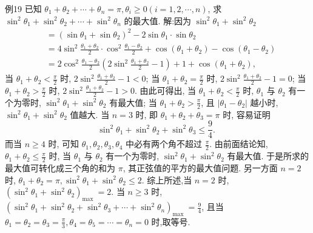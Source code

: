 例19 已知 $\theta_1+\theta_2+\cdots+\theta_n=\pi, \theta_i \geqslant 0 (i=1,2, \cdots, n)$, 求 $\sin ^2 \theta_1+\sin ^2 \theta_2+\cdots+\sin ^2 \theta_n$ 的最大值.
解:因为 $\sin ^2 \theta_1+\sin ^2 \theta_2$
$$
\begin{aligned}
& =\left(\sin \theta_1+\sin \theta_2\right)^2-2 \sin \theta_1 \cdot \sin \theta_2 \\
& =4 \sin ^2 \frac{\theta_1+\theta_2}{2} \cdot \cos ^2 \frac{\theta_1-\theta_2}{2}+\cos \left(\theta_1+\theta_2\right)-\cos \left(\theta_1-\theta_2\right) \\
& =2 \cos ^2 \frac{\theta_1-\theta_2}{2}\left(2 \sin ^2 \frac{\theta_1+\theta_2}{2}-1\right)+1+\cos \left(\theta_1+\theta_2\right),
\end{aligned}
$$
当 $\theta_1+\theta_2<\frac{\pi}{2}$ 时, $2 \sin ^2 \frac{\theta_1+\theta_2}{2}-1<0$;
当 $\theta_1+\theta_2=\frac{\pi}{2}$ 时, $2 \sin ^2 \frac{\theta_1+\theta_2}{2}-1=0$;
当 $\theta_1+\theta_2>\frac{\pi}{2}$ 时, $2 \sin ^2 \frac{\theta_1+\theta_2}{2}-1>0$.
由此可得出, 当 $\theta_1+\theta_2<\frac{\pi}{2}$ 时, $\theta_1$ 与 $\theta_2$ 有一个为零时, $\sin ^2 \theta_1+\sin ^2 \theta_2$ 有最大值; 当 $\theta_1+\theta_2>\frac{\pi}{2}$, 且 $\left|\theta_1-\theta_2\right|$ 越小时, $\sin ^2 \theta_1+\sin ^2 \theta_2$ 值越大.
当 $n=3$ 时, 即 $\theta_1+\theta_2+\theta_3=\pi$ 时, 容易证明
$$
\sin ^2 \theta_1+\sin ^2 \theta_2+\sin ^2 \theta_3 \leqslant \frac{9}{4} \text {. }
$$
而当 $n \geqslant 4$ 时, 可知 $\theta_1, \theta_2, \theta_3, \theta_4$ 中必有两个角不超过 $\frac{\pi}{2}$.
由前面结论知, $\theta_1+\theta_2 \leqslant \frac{\pi}{2}$ 时, 当 $\theta_1$ 与 $\theta_2$ 有一个为零时, $\sin ^2 \theta_1+\sin ^2 \theta_2$ 有最大值.
于是所求的最大值可转化成三个角的和为 $\pi$, 其正弦值的平方的最大值问题.
另一方面 $n=2$ 时, $\theta_1+\theta_2=\pi, \sin ^2 \theta_1+\sin ^2 \theta_2 \leqslant 2$.
综上所述,当 $n=2$ 时, $\left(\sin ^2 \theta_1+\sin ^2 \theta_2\right)_{\text {max }}=2$.
当 $n \geqslant 3$ 时, $\left(\sin ^2 \theta_1+\sin ^2 \theta_2+\sin ^2 \theta_3+\cdots+\sin ^2 \theta_n\right)_{\text {max }}=\frac{9}{4}$, 且当 $\theta_1= \theta_2=\theta_3=\frac{\pi}{3}, \theta_4=\theta_5=\cdots=\theta_n=0$ 时,取等号.



